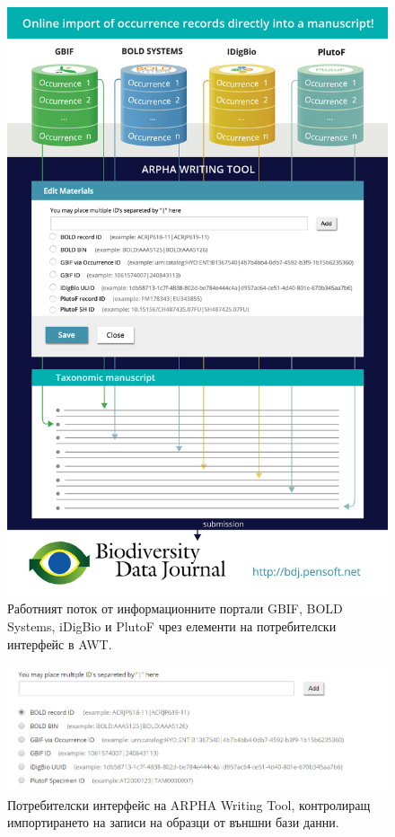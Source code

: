\begin{figure}
\centering
\includegraphics[width=\textwidth]{Figures/workflow-idigbio}
\decoRule
\caption{Работният поток от информационните портали GBIF, BOLD Systems, iDigBio и PlutoF чрез елементи на потребителски интерфейс в AWT.}
\label{fig:workflow-idigbio}
\end{figure}

\begin{figure}
\centering
\includegraphics[width=\textwidth]{Figures/occurrence-input-mask}
\decoRule
\caption{Потребителски интерфейс на ARPHA Writing Tool, контролиращ импортирането на записи на образци от външни бази данни.}
\label{fig:occurrence-input-mask}
\end{figure}

